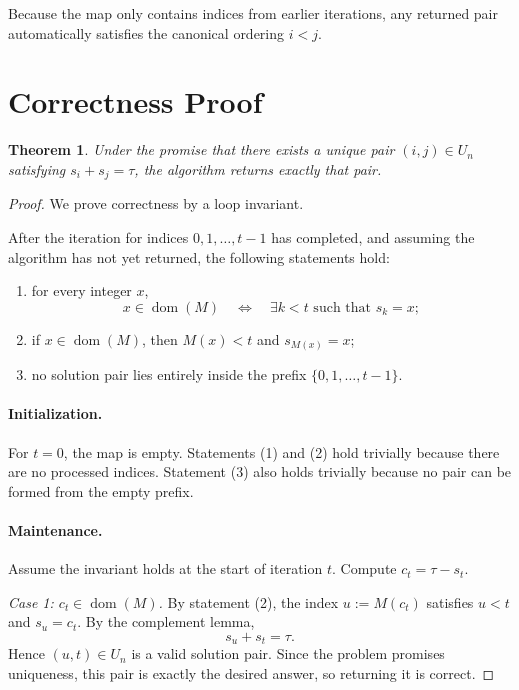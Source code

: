 \documentclass[11pt]{article}
\newtheorem{theorem}{Theorem}
\theoremstyle{remark}
\begin{document}
Because the map only contains indices from earlier iterations, any returned pair automatically satisfies the canonical ordering \(i < j\).

\section{Correctness Proof}

\begin{theorem}
Under the promise that there exists a unique pair \((i,j) \in U_n\) satisfying \(s_i + s_j = \tau\), the algorithm returns exactly that pair.
\end{theorem}

\begin{proof}
We prove correctness by a loop invariant.

After the iteration for indices \(0,1,\dots,t-1\) has completed, and assuming the algorithm has not yet returned, the following statements hold:
\begin{enumerate}
    \item for every integer \(x\),
    \[
    x \in \operatorname{dom}(M)
    \quad \Longleftrightarrow \quad
    \exists k < t \text{ such that } s_k = x;
    \]
    \item if \(x \in \operatorname{dom}(M)\), then \(M(x) < t\) and \(s_{M(x)} = x\);
    \item no solution pair lies entirely inside the prefix \(\{0,1,\dots,t-1\}\).
\end{enumerate}

\paragraph{Initialization.}
For \(t=0\), the map is empty. Statements (1) and (2) hold trivially because there are no processed indices. Statement (3) also holds trivially because no pair can be formed from the empty prefix.

\paragraph{Maintenance.}
Assume the invariant holds at the start of iteration \(t\). Compute \(c_t = \tau - s_t\).

\emph{Case 1: \(c_t \in \operatorname{dom}(M)\).}
By statement (2), the index \(u := M(c_t)\) satisfies \(u < t\) and \(s_u = c_t\). By the complement lemma,
\[
s_u + s_t = \tau.
\]
Hence \((u,t) \in U_n\) is a valid solution pair. Since the problem promises uniqueness, this pair is exactly the desired answer, so returning it is correct.


\end{proof}
\end{document}
